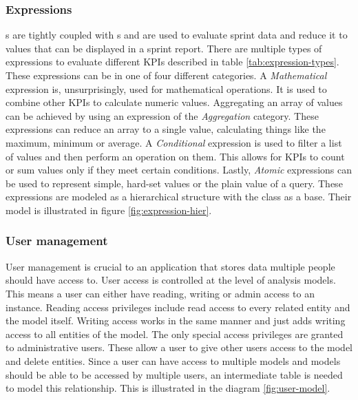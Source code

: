 \subsubsection{Expressions}\label{model-expressions}

s are tightly coupled with s and are used to evaluate sprint data and reduce it to values that can be displayed in a sprint report.
There are multiple types of expressions to evaluate different KPIs described in table \ref{tab:expression-types}.
These expressions can be in one of four different categories.
A \textit{Mathematical} expression is, unsurprisingly, used for mathematical operations.
It is used to combine other KPIs to calculate numeric values.
Aggregating an array of values can be achieved by using an expression of the \textit{Aggregation} category.
These expressions can reduce an array to a single value, calculating things like the maximum, minimum or average.
A \textit{Conditional} expression is used to filter a list of values and then perform an operation on them.
This allows for KPIs to count or sum values only if they meet certain conditions.
Lastly, \textit{Atomic} expressions can be used to represent simple, hard-set values or the plain value of a query. 
These expressions are modeled as a hierarchical structure with the  class as a base.
Their model is illustrated in figure \ref{fig:expression-hier}.

\subsubsection{User management}

User management is crucial to an application that stores data multiple people should have access to. 
User access is controlled at the level of analysis models. 
This means a user can either have reading, writing or admin access to an  instance. 
Reading access privileges include read access to every related entity and the model itself.
Writing access works in the same manner and just adds writing access to all entities of the model. 
The only special access privileges are granted to administrative users. 
These allow a user to give other users access to the model and delete entities. 
Since a user can have access to multiple models and models should be able to be accessed by multiple users, an intermediate table is needed to model this relationship. 
This is illustrated in the diagram \ref{fig:user-model}.

